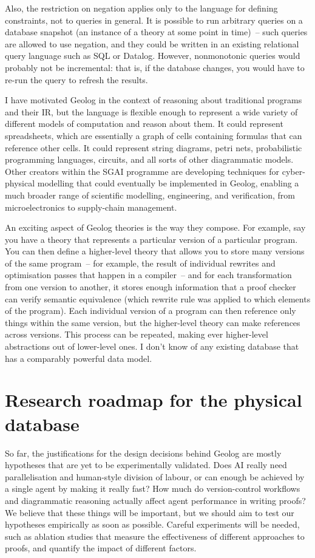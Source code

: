 \documentclass{article}
\begin{document}
Also, the restriction on negation applies only to the language for defining constraints, not to queries in general.
It is possible to run arbitrary queries on a database snapshot (an instance of a theory at some point in time)~-- such queries are allowed to use negation, and they could be written in an existing relational query language such as SQL or Datalog.
However, nonmonotonic queries would probably not be incremental: that is, if the database changes, you would have to re-run the query to refresh the results.

I have motivated Geolog in the context of reasoning about traditional programs and their IR, but the language is flexible enough to represent a wide variety of different models of computation and reason about them.
It could represent spreadsheets, which are essentially a graph of cells containing formulas that can reference other cells.
It could represent string diagrams, petri nets, probabilistic programming languages, circuits, and all sorts of other diagrammatic models.
Other creators within the SGAI programme are developing techniques for cyber-physical modelling that could eventually be implemented in Geolog, enabling a much broader range of scientific modelling, engineering, and verification, from microelectronics to supply-chain management.

An exciting aspect of Geolog theories is the way they compose.
For example, say you have a theory that represents a particular version of a particular program.
You can then define a higher-level theory that allows you to store many versions of the same program~-- for example, the result of individual rewrites and optimisation passes that happen in a compiler~-- and for each transformation from one version to another, it stores enough information that a proof checker can verify semantic equivalence (which rewrite rule was applied to which elements of the program).
Each individual version of a program can then reference only things within the same version, but the higher-level theory can make references across versions.
This process can be repeated, making ever higher-level abstractions out of lower-level ones.
I don't know of any existing database that has a comparably powerful data model.

\section{Research roadmap for the physical database}

So far, the justifications for the design decisions behind Geolog are mostly hypotheses that are yet to be experimentally validated.
Does AI really need parallelisation and human-style division of labour, or can enough be achieved by a single agent by making it really fast?
How much do version-control workflows and diagrammatic reasoning actually affect agent performance in writing proofs?
We believe that these things will be important, but we should aim to test our hypotheses empirically as soon as possible.
Careful experiments will be needed, such as ablation studies that measure the effectiveness of different approaches to proofs, and quantify the impact of different factors.
\end{document}
